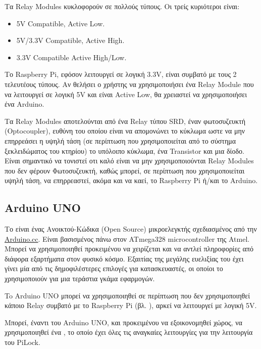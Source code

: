 		Τα Relay Modules κυκλοφορούν σε πολλούς τύπους. Οι τρείς κυριότεροι είναι:
		\begin{itemize}
			\item 5V Compatible, Active Low. 
			\item 5V/3.3V Compatible, Active High.
			\item 3.3V Compatible Active High/Low.
		\end{itemize}

		Το Raspberry Pi, εφόσον λειτουργεί σε λογική 3.3V, είναι συμβατό με τους 2 τελευτέους τύπους. Αν θελήσει ο χρήστης να χρησιμοποιήσει ένα Relay Module που να λειτουργεί σε λογική 5V και είναι Active Low, θα χρειαστεί να χρησιμοποιήσει ένα Arduino.

		Τα Relay Modules αποτελούνται από ένα Relay τύπου SRD, έναν φωτοσυζευκτή (Optocoupler), ευθύνη του οποίου είναι να απομονώνει το κύκλωμα ωστε να μην επηρρεάσει η υψηλή τάση (σε περίπτωση που χρησιμοποιείται από το σύστημα ξεκλειδώματος του κτηρίου) το υπόλοιπο κύκλωμα, ένα Transistor και μια δίοδο. Είναι σημαντικό να τονιστεί οτι καλό είναι να μην χρησιμοποιούνται Relay Modules που δεν φέρουν Φωτοσυζευκτή, καθώς μπορεί, σε περίπτωση που χρησιμοποιείται υψηλή τάση, να επηρρεαστεί, ακόμα και να καεί, το Raspberry Pi ή/και το Arduino. %


	\subsection{Arduino UNO}
		Το \textbf{} είναι ένας Ανοικτού-Κώδικα (Open Source) μικροελεγκτής σχεδιασμένος από την \href{https://www.arduino.cc/}{Arduino.cc}. Είναι βασισμένος πάνω στον ATmega328 microcontroller της Atmel. Μπορεί να χρησιμοποιηθεί προκειμένου να χειρίζεται και να αντλεί πληροφορίες από διάφορα εξαρτήματα στον φυσικό κόσμο. Εξαιτίας της μεγάλης ευελιξίας του έχει γίνει μία από τις δημοφιλέστερες επιλογές για κατασκευαστές, οι οποίοι το χρησιμοποιούν για μια τεράστια γκάμα εφαρμογών.

		To Arduino UNO μπορεί να χρησιμοποιηθεί σε περίπτωση που δεν χρησιμοποιηθεί κάποιο Relay συμβατό με το Raspberry Pi (βλ. ), αρκεί να λειτουργεί με λογική 5V.

		Μπορεί, έναντι του Arduino UNO, και προκειμένου να εξοικονομηθεί χώρος, να χρησιμοποιηθεί ένα , το οποίο έχει όλες τις αναγκαίες λειτουργίες για την λειτουργία του PiLock.

